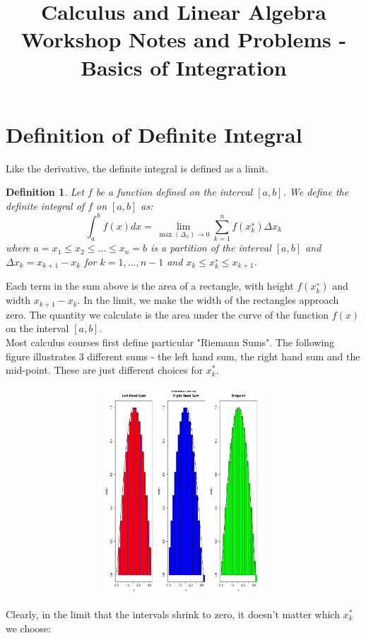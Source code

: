 \documentclass[12pt,a4paper]{article} %
\title{Calculus and Linear Algebra Workshop Notes and Problems - Basics of Integration}
\newtheorem{defn}{Definition}
\begin{document}
\maketitle
\section{Definition of Definite Integral}
Like the derivative, the definite integral is defined as a limit.
\begin{defn}
Let $f$ be a function defined on the interval $[a, b]$. We define the definite
integral of $f$ on $[a, b]$ as:
$$\int_a^b f(x)dx = \lim_{\max(\Delta_x)\rightarrow 0}\sum_{k=1}^n f (x^∗_k )\Delta x_k$$
where $a = x_1 \leq x_2 \leq ... \leq x_n = b$ is a partition of the interval $[a, b]$ and $\Delta x_k = x_{k+1} − x_k$
for $k = 1, ..., n − 1$ and $x_k \leq x^∗_k \leq x_{k+1}$.
\end{defn}
Each term in the sum above is the area of a rectangle, with height $f (x^∗_k)$ and width
$x_{k+1} − x_k$. In the limit, we make the width of the rectangles approach zero. The
quantity we calculate is the area under the curve of the function $f(x)$ on the interval
$[a, b]$.\\
Most calculus courses first define particular "Riemann Sums". The following figure illustrates 3 different sums - the left hand sum, the right hand sum and the mid-point. These are just different choices for $x^*_k$. \\\\

\includegraphics[width = 6in,height=3in]{RSums.pdf}

Clearly, in the limit that the intervals shrink to zero, it doesn't matter which $x^*_k$ we choose:\\\\
\end{document}

